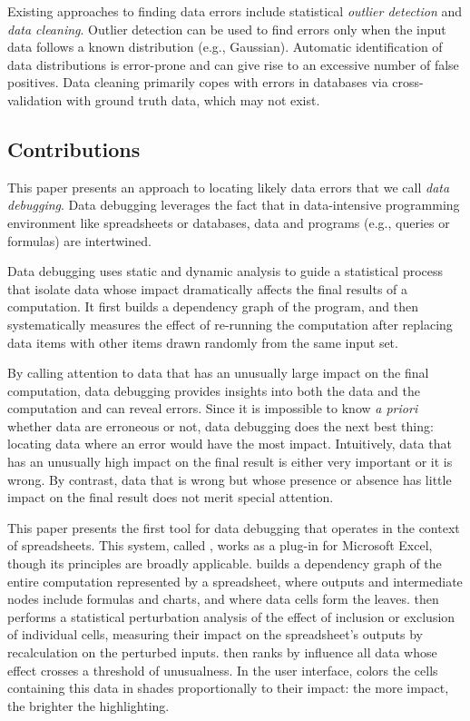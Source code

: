 
Existing approaches to finding data errors include
statistical \emph{outlier detection} and \emph{data cleaning}. Outlier
detection can be used to find errors only when the input data follows
a known distribution (e.g., Gaussian). Automatic identification of
data distributions is error-prone and can give rise to an excessive
number of false positives. Data cleaning primarily copes with errors
in databases via cross-validation with ground truth data, which may
not exist.

\subsection*{Contributions}

This paper presents an approach to locating likely data errors that we
call \emph{data debugging}. Data debugging leverages the fact that in
data-intensive programming environment like spreadsheets or databases,
data and programs (e.g., queries or formulas) are intertwined.


Data debugging uses static and dynamic analysis to guide a statistical
process that isolate data whose impact dramatically affects the final
results of a computation. It first builds a dependency graph of
the program, and then systematically measures the effect of re-running
the computation after replacing data items with other items drawn
randomly from the same input set.

By calling attention to data that has an unusually large impact on the
final computation, data debugging provides insights into both the data
and the computation and can reveal errors. Since it is impossible to
know \emph{a priori} whether data are erroneous or not, data debugging
does the next best thing: locating data where an error would have the
most impact. Intuitively, data that has an unusually high impact on
the final result is either very important or it is wrong. By
contrast, data that is wrong but whose presence or absence has little
impact on the final result does not merit special attention.

This paper presents the first tool for data debugging that operates in
the context of spreadsheets. This system, called \checkcell{}, works
as a plug-in for Microsoft Excel, though its principles are broadly
applicable. \checkcell{} builds a dependency graph of the entire
computation represented by a spreadsheet, where outputs and
intermediate nodes include formulas and charts, and where data cells
form the leaves. \checkcell{} then performs a statistical perturbation
analysis of the effect of inclusion or exclusion of individual cells,
measuring their impact on the spreadsheet's outputs by recalculation
on the perturbed inputs. \checkcell{} then ranks by influence all
data whose effect crosses a threshold of unusualness. In the user
interface, \checkcell{} colors the cells containing this data in
shades proportionally to their impact: the more impact, the brighter
the highlighting.


